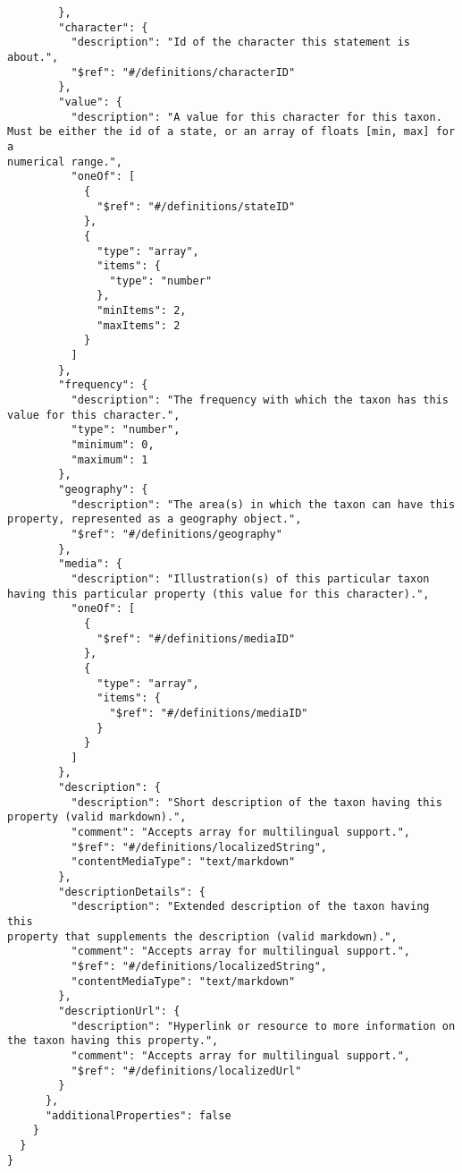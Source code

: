 \documentclass[10pt,letterpaper]{article}
\begin{document}
\begin{verbatim}
        },
        "character": {
          "description": "Id of the character this statement is
about.",
          "$ref": "#/definitions/characterID"
        },
        "value": {
          "description": "A value for this character for this taxon.
Must be either the id of a state, or an array of floats [min, max] for a
numerical range.",
          "oneOf": [
            {
              "$ref": "#/definitions/stateID"
            },
            {
              "type": "array",
              "items": {
                "type": "number"
              },
              "minItems": 2,
              "maxItems": 2
            }
          ]
        },
        "frequency": {
          "description": "The frequency with which the taxon has this
value for this character.",
          "type": "number",
          "minimum": 0,
          "maximum": 1
        },
        "geography": {
          "description": "The area(s) in which the taxon can have this
property, represented as a geography object.",
          "$ref": "#/definitions/geography"
        },
        "media": {
          "description": "Illustration(s) of this particular taxon
having this particular property (this value for this character).",
          "oneOf": [
            {
              "$ref": "#/definitions/mediaID"
            },
            {
              "type": "array",
              "items": {
                "$ref": "#/definitions/mediaID"
              }
            }
          ]
        },
        "description": {
          "description": "Short description of the taxon having this
property (valid markdown).",
          "comment": "Accepts array for multilingual support.",
          "$ref": "#/definitions/localizedString",
          "contentMediaType": "text/markdown"
        },
        "descriptionDetails": {
          "description": "Extended description of the taxon having this
property that supplements the description (valid markdown).",
          "comment": "Accepts array for multilingual support.",
          "$ref": "#/definitions/localizedString",
          "contentMediaType": "text/markdown"
        },
        "descriptionUrl": {
          "description": "Hyperlink or resource to more information on
the taxon having this property.",
          "comment": "Accepts array for multilingual support.",
          "$ref": "#/definitions/localizedUrl"
        }
      },
      "additionalProperties": false
    }
  }
}
\end{verbatim}
\nolinenumbers
\end{document}
